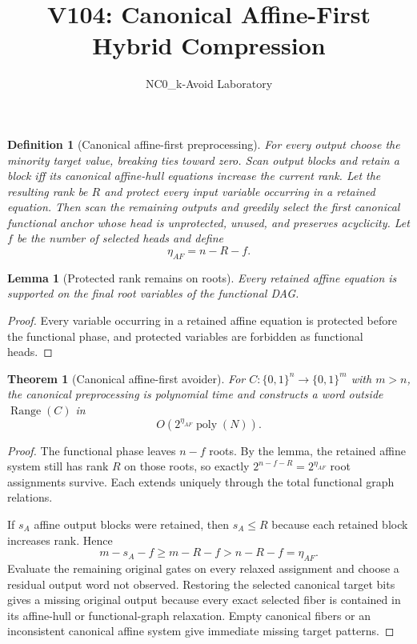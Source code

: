 \documentclass[11pt]{article}
\title{V104: Canonical Affine-First Hybrid Compression}
\author{NC0\_k-Avoid Laboratory}
\date{}
\newtheorem{theorem}{Theorem}
\newtheorem{lemma}{Lemma}
\newtheorem{definition}{Definition}
\begin{document}
\maketitle

\begin{definition}[Canonical affine-first preprocessing]
For every output choose the minority target value, breaking ties toward zero.
Scan output blocks and retain a block iff its canonical affine-hull equations
increase the current rank. Let the resulting rank be $R$ and protect every
input variable occurring in a retained equation. Then scan the remaining
outputs and greedily select the first canonical functional anchor whose head is
unprotected, unused, and preserves acyclicity. Let $f$ be the number of selected
heads and define
\[
\eta_{AF}=n-R-f.
\]
\end{definition}

\begin{lemma}[Protected rank remains on roots]
Every retained affine equation is supported on the final root variables of the
functional DAG.
\end{lemma}
\begin{proof}
Every variable occurring in a retained affine equation is protected before the
functional phase, and protected variables are forbidden as functional heads.
\end{proof}

\begin{theorem}[Canonical affine-first avoider]
For $C:\{0,1\}^n\to\{0,1\}^m$ with $m>n$, the canonical preprocessing is
polynomial time and constructs a word outside $\operatorname{Range}(C)$ in
\[
O(2^{\eta_{AF}}\operatorname{poly}(N)).
\]
\end{theorem}
\begin{proof}
The functional phase leaves $n-f$ roots. By the lemma, the retained affine
system still has rank $R$ on those roots, so exactly
$2^{n-f-R}=2^{\eta_{AF}}$ root assignments survive. Each extends uniquely
through the total functional graph relations.

If $s_A$ affine output blocks were retained, then $s_A\le R$ because each
retained block increases rank. Hence
\[
m-s_A-f\ge m-R-f>n-R-f=\eta_{AF}.
\]
Evaluate the remaining original gates on every relaxed assignment and choose a
residual output word not observed. Restoring the selected canonical target bits
gives a missing original output because every exact selected fiber is contained
in its affine-hull or functional-graph relaxation. Empty canonical fibers or an
inconsistent canonical affine system give immediate missing target patterns.
\end{proof}
\end{document}
